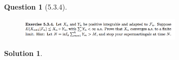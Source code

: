 \documentclass[11pt]{article}
\theoremstyle{plain}
\theoremstyle{quest}
\newtheorem*{question}{Question}
\newtheorem*{solution}{Solution}
\begin{document}
\newpage

\begin{question}[5.3.4]
\hfill
\begin{figure}[h!]
  \centering
    \includegraphics[width=0.7\textwidth]{d-5-3-4.png}
\end{figure}
\end{question}
\begin{solution} \hfill \\
\end{solution}
\end{document}
